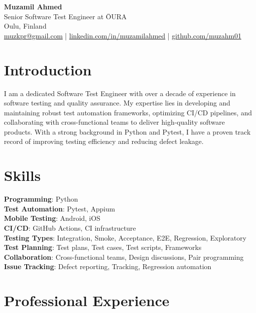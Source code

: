 \documentclass[12pt]{article}
\begin{document}
\begin{center}
    {\LARGE \textbf{Muzamil Ahmed}}\\
    Senior Software Test Engineer at ŌURA \\
    \vspace{0.1cm}
    Oulu, Finland \\
    \href{mailto:muzkpr@gmail.com}{muzkpr@gmail.com} \quad |
    \href{https://linkedin.com/in/muzamilahmed}{linkedin.com/in/muzamilahmed} \quad | \quad \href{https://github.com/muzahm01}{github.com/muzahm01}
    \vspace{0.2cm}
\end{center}

\section*{Introduction}\label{introduction}

I am a dedicated Software Test Engineer with over a decade of experience in software
testing and quality assurance. My expertise lies in developing and maintaining robust test automation frameworks, optimizing CI/CD pipelines, and collaborating with cross-functional teams
to deliver high-quality software products. With a strong background in Python and Pytest, I have
a proven track record of improving testing efficiency and reducing defect leakage.


\section*{Skills}\label{skills}

\textbf{Programming}: Python \\
\textbf{Test Automation}: Pytest, Appium \\
\textbf{Mobile Testing}: Android, iOS \\
\textbf{CI/CD}: GitHub Actions, CI infrastructure \\
\textbf{Testing Types}: Integration, Smoke, Acceptance, E2E, Regression, Exploratory \\
\textbf{Test Planning}: Test plans, Test cases, Test scripts, Frameworks \\
\textbf{Collaboration}: Cross-functional teams, Design discussions, Pair programming \\
\textbf{Issue Tracking}: Defect reporting, Tracking, Regression automation

\section*{Professional Experience}\label{experience}
\end{document}
